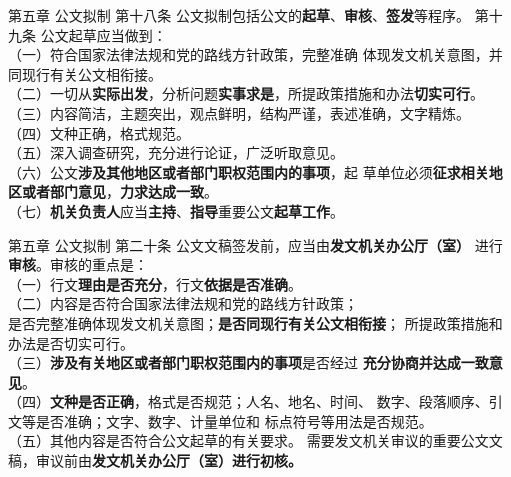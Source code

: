 \documentclass[aspectratio=169]{beamer}
\begin{document}
    \begin{frame}[t]{第五章 公文拟制} \vspace{20pt}
        第十八条 公文拟制包括公文的\textbf{起草}、\textbf{审核}、\textbf{签发}等程序。
        第十九条 公文起草应当做到：\\
        （一）符合国家法律法规和党的路线方针政策，完整准确
        体现发文机关意图，并同现行有关公文相衔接。\\
        （二）一切从\textbf{实际出发}，分析问题\textbf{实事求是}，所提政策措施和办法\textbf{切实可行}。\\
        （三）内容简洁，主题突出，观点鲜明，结构严谨，表述准确，文字精炼。\\
        （四）文种正确，格式规范。\\
        （五）深入调查研究，充分进行论证，广泛听取意见。\\
        （六）公文\textbf{涉及其他地区或者部门职权范围内的事项}，起
        草单位必须\textbf{征求相关地区或者部门意见}，\textbf{力求达成一致}。\\
        （七）\textbf{机关负责人}应当\textbf{主持}、\textbf{指导}重要公文\textbf{起草工作}。
    \end{frame}



    \begin{frame}[t]{第五章 公文拟制} \vspace{20pt}
        第二十条 公文文稿签发前，应当由\textbf{发文机关办公厅（室）}
        进行\textbf{审核}。审核的重点是：\\
        （一）行文\textbf{理由是否充分}，行文\textbf{依据是否准确}。\\
        （二）内容是否符合国家法律法规和党的路线方针政策；\\
        是否完整准确体现发文机关意图；\textbf{是否同现行有关公文相衔接}；
        所提政策措施和办法是否切实可行。\\
        （三）\textbf{涉及有关地区或者部门职权范围内的事项}是否经过
        \textbf{充分协商并达成一致意见}。\\
        （四）\textbf{文种是否正确}，格式是否规范；人名、地名、时间、
        数字、段落顺序、引文等是否准确；文字、数字、计量单位和
        标点符号等用法是否规范。\\
        （五）其他内容是否符合公文起草的有关要求。
        需要发文机关审议的重要公文文稿，审议前由\textbf{发文机关办公厅（室）进行初核。}\\
    \end{frame}
\end{document}
